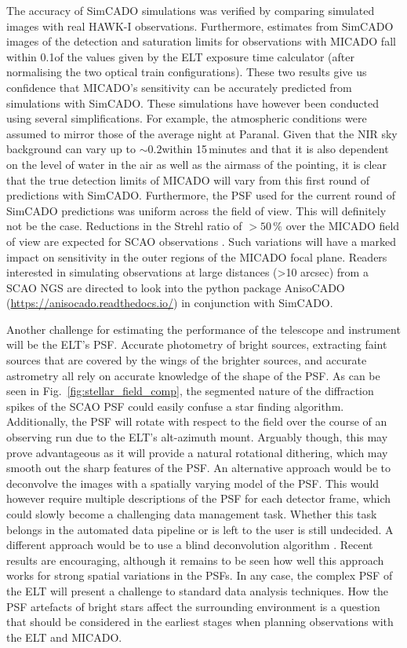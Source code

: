 The accuracy of SimCADO simulations was verified by comparing simulated images with real HAWK-I observations.
Furthermore, estimates from SimCADO images of the detection and saturation limits for observations with MICADO fall within 0.1\m of the values given by the ELT exposure time calculator (after normalising the two optical train configurations).
These two results give us confidence that MICADO's sensitivity can be accurately predicted from simulations with SimCADO.
These simulations have however been conducted using several simplifications.
For example, the atmospheric conditions were assumed to mirror those of the average night at Paranal.
Given that the NIR sky background can vary up to $\sim 0.2$\m within 15\,minutes \citep{moreels08} and that it is also dependent on the level of water in the air as well as the airmass of the pointing, it is clear that the true detection limits of MICADO will vary from this first round of predictions with SimCADO.
Furthermore, the PSF used for the current round of SimCADO predictions was uniform across the field of view.
This will definitely not be the case.
Reductions in the Strehl ratio of $>50\,\%$ over the MICADO field of view are expected for SCAO observations \citep{clenet2015}.
Such variations will have a marked impact on sensitivity in the outer regions of the MICADO focal plane.
Readers interested in simulating observations at large distances (>10 arcsec) from a SCAO NGS are directed to look into the python package AnisoCADO (\url{https://anisocado.readthedocs.io/}) in conjunction with SimCADO.

Another challenge for estimating the performance of the telescope and instrument will be the ELT's PSF.
Accurate photometry of bright sources, extracting faint sources that are covered by the wings of the brighter sources, and accurate astrometry all rely on accurate knowledge of the shape of the PSF.
As can be seen in Fig.~\ref{fig:stellar_field_comp}, the segmented nature of the diffraction spikes of the SCAO PSF could easily confuse a star finding algorithm.
Additionally, the PSF will rotate with respect to the field over the course of an observing run due to the ELT's alt-azimuth mount.
Arguably though, this may prove advantageous as it will provide a natural rotational dithering, which may smooth out the sharp features of the PSF.
An alternative approach would be to deconvolve the images with a spatially varying model of the PSF.
This would however require multiple descriptions of the PSF for each detector frame, which could slowly become a challenging data management task.
Whether this task belongs in the automated data pipeline or is left to the user is still undecided.
A different approach would be to use a blind deconvolution algorithm \citep{vorontsov2017}.
Recent results are encouraging, although it remains to be seen how well this approach works for strong spatial variations in the PSFs.
In any case, the complex PSF of the ELT will present a challenge to standard data analysis techniques.
How the PSF artefacts of bright stars affect the surrounding environment is a question that should be considered in the earliest stages when planning observations with the ELT and MICADO.
